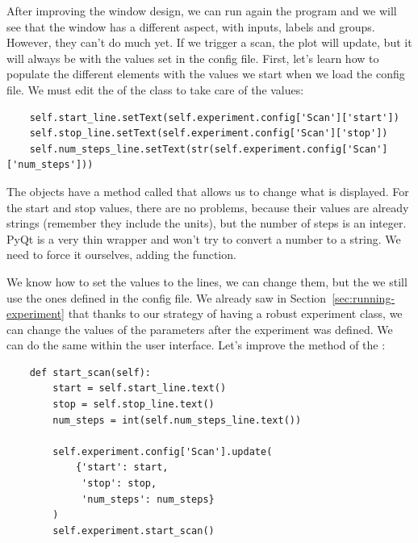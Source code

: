 
After improving the window design, we can run again the program and we will see that the window has a different aspect, with inputs, labels and groups. However, they can't do much yet. If we trigger a scan, the plot will update, but it will always be with the values set in the config file. First, let's learn how to populate the different elements with the values we start when we load the config file. We must edit the  of the  class to take care of the values:

\begin{verbatim}
    self.start_line.setText(self.experiment.config['Scan']['start'])
    self.stop_line.setText(self.experiment.config['Scan']['stop'])
    self.num_steps_line.setText(str(self.experiment.config['Scan'] ['num_steps']))
\end{verbatim}

The  objects have a method called  that allows us to change what is displayed. For the start and stop values, there are no problems, because their values are already strings (remember they include the units), but the number of steps is an integer. PyQt is a very thin wrapper and won't try to convert a number to a string. We need to force it ourselves, adding the  function.


We know how to set the values to the lines, we can change them, but the we still use the ones defined in the config file. We already saw in Section~\ref{sec:running-experiment} that thanks to our strategy of having a robust experiment class, we can change the values of the parameters after the experiment was defined. We can do the same within the user interface. Let's improve the  method of the :

\begin{verbatim}
    def start_scan(self):
        start = self.start_line.text()
        stop = self.stop_line.text()
        num_steps = int(self.num_steps_line.text())

        self.experiment.config['Scan'].update(
            {'start': start,
             'stop': stop,
             'num_steps': num_steps}
        )
        self.experiment.start_scan()
\end{verbatim}

